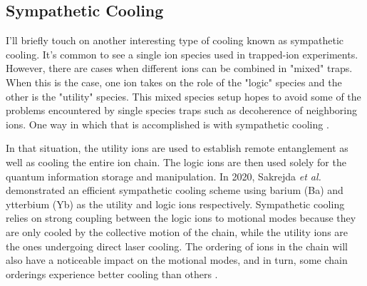 \subsection{Sympathetic Cooling}
I'll briefly touch on another interesting type of cooling known as sympathetic cooling. It's common to see a single ion species used in trapped-ion experiments. However, there are cases when different ions can be combined in "mixed" traps. When this is the case, one ion takes on the role of the "logic" species and the other is the "utility" species. This mixed species setup hopes to avoid some of the problems encountered by single species traps such as decoherence of neighboring ions. One way in which that is accomplished is with sympathetic cooling \cite{Sakrejda}. 

In that situation, the utility ions are used to establish remote entanglement as well as cooling the entire ion chain. The logic ions are then used solely for the quantum information storage and manipulation. In 2020, Sakrejda \textit{et al.} demonstrated an efficient sympathetic cooling scheme using barium (Ba) and ytterbium (Yb) as the utility and logic ions respectively. Sympathetic cooling relies on strong coupling between the logic ions to motional modes because they are only cooled by the collective motion of the chain, while the utility ions are the ones undergoing direct laser cooling. The ordering of ions in the chain will also have a noticeable impact on the motional modes, and in turn, some chain orderings experience better cooling than others \cite{Sakrejda}.